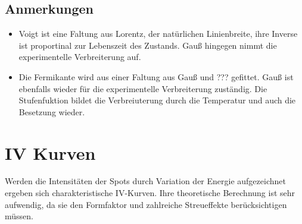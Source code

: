             \subsection{Anmerkungen}
            \begin{itemize}
                \item Voigt ist eine Faltung aus Lorentz, der natürlichen Linienbreite, ihre Inverse ist proportinal zur Lebenszeit des Zustands. Gauß hingegen nimmt die experimentelle Verbreiterung auf.
                \item Die Fermikante wird aus einer Faltung aus Gauß und ??? gefittet. Gauß ist ebenfalls wieder für die experimentelle Verbreiterung zuständig. Die Stufenfuktion bildet die Verbreiuterung durch die Temperatur und auch die Besetzung wieder.
            \end{itemize}

            \section{IV Kurven}
            Werden die Intensitäten der Spots durch Variation der Energie aufgezeichnet ergeben sich charakteristische IV-Kurven.
            Ihre theoretische Berechnung ist sehr aufwendig, da sie den Formfaktor und zahlreiche Streueffekte berücksichtigen müssen.